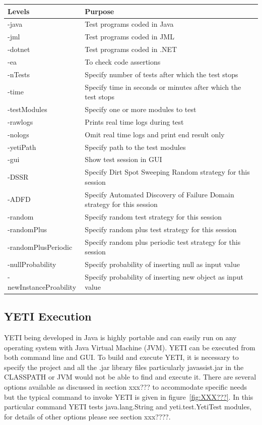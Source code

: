 {\begin{table}[h]
\begin{tabular}{ll }
Levels 					&Purpose 			\\
\hline
-java						&Test programs coded in Java	 	\\
-jml						&Test programs coded in JML			\\
-dotnet					&Test programs coded in .NET		\\
-ea						&To check code assertions \\
-nTests					&Specify number of tests after which the test stops	\\
-time						&Specify time in seconds or minutes after which the test stops\\
-testModules				&Specify one or more modules to test 	\\
-rawlogs					&Prints real time logs during test \\
-nologs					&Omit real time logs and print end result only\\
-yetiPath					&Specify path to the test modules\\ 
-gui						&Show test session in GUI\\
-DSSR					&Specify Dirt Spot Sweeping Random strategy for this session\\
-ADFD					&Specify Automated Discovery of Failure Domain strategy for this session\\
-random					&Specify random test strategy for this session\\
-randomPlus				&Specify random plus test strategy for this session\\
-randomPlusPeriodic		&Specify random plus periodic test strategy for this session\\
-nullProbability				&Specify probability of inserting null as input value\\
-newInstanceProability		&Specify probability of inserting new object as input value\\

\hline %
\end{tabular}
\bigskip
\label{table:cliOptions} %
\end{table}


\subsection{YETI Execution}
YETI being developed in Java is highly portable and can easily run on any operating system with Java Virtual Machine (JVM). YETI can be executed from both command line and GUI. To build and execute YETI, it is necessary to specify the project and all the .jar library files particularly javassist.jar in the CLASSPATH or JVM would not be able to find and execute it. There are several options available as discussed in section xxx??? to accommodate specific needs but the typical command to invoke YETI is given in figure~\ref{fig:XXX???}. In this particular command YETI tests java.lang.String and yeti.test.YetiTest modules, for details of other options please see section xxx????. 

}
